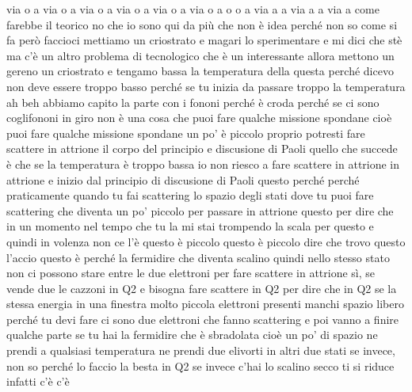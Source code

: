 via o a via o a via o a via o a via o a via o a o o a via a a via a a via a come farebbe il teorico no che io sono qui da più che non è idea perché non so come si fa però faccioci mettiamo un criostrato e magari lo sperimentare e mi dici che stè ma c'è un altro problema di tecnologico che è un interessante allora mettono un gereno un criostrato e tengamo bassa la temperatura della questa perché dicevo non deve essere troppo basso perché se tu inizia da passare troppo la temperatura ah beh abbiamo capito la parte con i fononi perché è croda perché se ci sono coglifononi in giro non è una cosa che puoi fare qualche missione spondane cioè puoi fare qualche missione spondane un po' è piccolo proprio potresti fare scattere in attrione il corpo del principio e discusione di Paoli quello che succede è che se la temperatura è troppo bassa io non riesco a fare scattere in attrione in attrione e inizio dal principio di discusione di Paoli questo perché perché praticamente quando tu fai scattering lo spazio degli stati dove tu puoi fare scattering che diventa un po' piccolo per passare in attrione questo per dire che in un momento nel tempo che tu la mi stai trompendo la scala per questo e quindi in volenza non ce l'è questo è piccolo questo è piccolo dire che trovo questo l'accio questo è perché la fermidire che diventa scalino quindi nello stesso stato non ci possono stare entre le due elettroni per fare scattere in attrione sì, se vende due le cazzoni in Q2 e bisogna fare scattere in Q2 per dire che in Q2 se la stessa energia in una finestra molto piccola elettroni presenti manchi spazio libero perché tu devi fare ci sono due elettroni che fanno scattering e poi vanno a finire qualche parte se tu hai la fermidire che è sbradolata cioè un po' di spazio ne prendi a qualsiasi temperatura ne prendi due elivorti in altri due stati se invece, non so perché lo faccio la besta in Q2 se invece c'hai lo scalino secco ti si riduce infatti c'è c'è 

